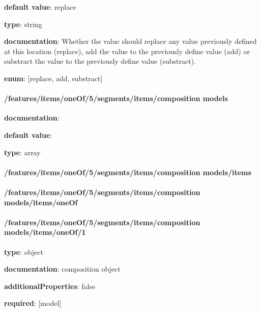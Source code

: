 \begin{itemized}
\item {\bf default value}: replace
\item {\bf type}: string
\item {\bf documentation}: Whether the value should replace any value previously defined at this location (replace), add the value to the previously define value (add) or substract the value to the previously define value (substract).
\item {\bf enum}: [replace, add, substract]\end{itemized}\paragraph{/features/items/oneOf/5/segments/items/composition models} \begin{itemized}
\item {\bf documentation}: 
\item {\bf default value}: 
\item {\bf type}: array
\paragraph{/features/items/oneOf/5/segments/items/composition models/items} \begin{itemized}
\end{itemized}\end{itemized}\paragraph{/features/items/oneOf/5/segments/items/composition models/items/oneOf} \begin{itemized}
\end{itemized}\paragraph{/features/items/oneOf/5/segments/items/composition models/items/oneOf/1} \begin{itemized}
\item {\bf type}: object
\item {\bf documentation}: composition object
\item {\bf additionalProperties}: false
\item {\bf required}: [model]\end{itemized}
